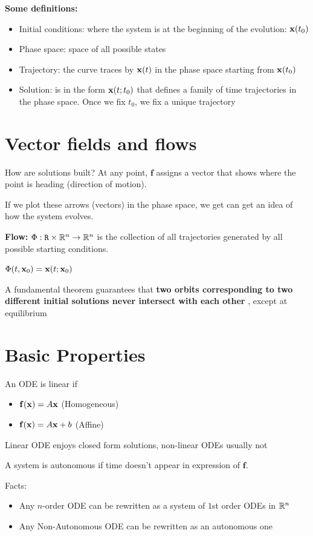 \textbf{Some definitions:}

\begin{itemize}
    \item Initial conditions: where the system is at the beginning of the evolution:
    $\mathbf{x}(t_0)$
    \item Phase space: space of all possible states 
    \item Trajectory: the curve traces by $\mathbf{x}(t)$ in the phase space starting from $\mathbf{x}(t_0)$
    \item Solution: is in the form $\mathbf{x}(t; t_0)$ that defines a family of time trajectories 
    in the phase space. Once we fix $t_0$, we fix a unique trajectory
\end{itemize}

\section*{Vector fields and flows}
How are solutions built? At any point, $\mathbf{f}$ assigns a vector 
that shows where the point is heading (direction of motion).

If we plot these arrows (vectors) in the phase space, we get can 
get an idea of how the system evolves. 

\textbf{Flow: } $\Phi: \mathtt{R} \times \mathbb{R}^n \to \mathbb{R}^n$ is the collection of 
all trajectories generated by all possible starting conditions. 

$\Phi(t, \mathbf{x}_0) = \mathbf{x}(t; \mathbf{x}_0)$


A fundamental theorem guarantees 
that \textbf{two orbits corresponding to two different initial solutions never intersect with
each other }, except at equilibrium

\section*{Basic Properties}

An ODE is linear if 
\begin{itemize}
    \item $\mathbf{f}(\mathbf{x}) = A\mathbf{x}$ (Homogeneous)
    \item $\mathbf{f}(\mathbf{x}) = A\mathbf{x} + b$ (Affine)
\end{itemize}

Linear ODE enjoys closed form solutions, non-linear ODEs usually not


A system is autonomous if time doesn't appear in expression of $\mathbf{f}$.

Facts:
\begin{itemize}
    \item Any $n$-order ODE can be rewritten as a system of $1$st order ODEs in $\mathbb{R}^n$
    \item Any Non-Autonomous ODE can be rewritten as an autonomous one
\end{itemize}

